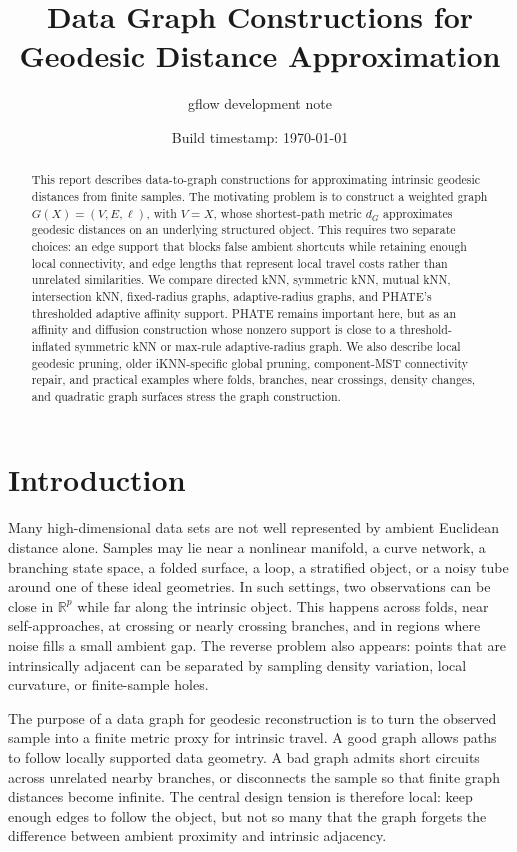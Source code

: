 \documentclass[11pt]{article}
\title{Data Graph Constructions for Geodesic Distance Approximation}
\author{gflow development note}
\date{Build timestamp: \today}
\newcommand{\R}{\mathbb{R}}
\begin{document}
\maketitle

\begin{abstract}
This report describes data-to-graph constructions for approximating intrinsic geodesic
distances from finite samples.  The motivating problem is to construct a weighted graph
\(G(X)=(V,E,\ell)\), with \(V=X\), whose shortest-path metric \(d_G\) approximates
geodesic distances on an underlying structured object.  This requires two separate
choices: an edge support that blocks false ambient shortcuts while retaining enough local
connectivity, and edge lengths that represent local travel costs rather than unrelated
similarities.  We compare directed kNN, symmetric kNN, mutual kNN, intersection kNN,
fixed-radius graphs, adaptive-radius graphs, and PHATE's thresholded adaptive affinity
support.  PHATE remains important here, but as an affinity and diffusion construction
whose nonzero support is close to a threshold-inflated symmetric kNN or max-rule
adaptive-radius graph.  We also describe local geodesic pruning, older iKNN-specific
global pruning, component-MST connectivity repair, and practical examples where folds,
branches, near crossings, density changes, and quadratic graph surfaces stress the graph
construction.
\end{abstract}

\section{Introduction}

Many high-dimensional data sets are not well represented by ambient Euclidean distance
alone.  Samples may lie near a nonlinear manifold, a curve network, a branching state
space, a folded surface, a loop, a stratified object, or a noisy tube around one of these
ideal geometries.  In such settings, two observations can be close in \(\R^p\) while far
along the intrinsic object.  This happens across folds, near self-approaches, at crossing
or nearly crossing branches, and in regions where noise fills a small ambient gap.  The
reverse problem also appears: points that are intrinsically adjacent can be separated by
sampling density variation, local curvature, or finite-sample holes.

The purpose of a data graph for geodesic reconstruction is to turn the observed sample
into a finite metric proxy for intrinsic travel.  A good graph allows paths to follow
locally supported data geometry.  A bad graph admits short circuits across unrelated
nearby branches, or disconnects the sample so that finite graph distances become infinite.
The central design tension is therefore local: keep enough edges to follow the object, but
not so many that the graph forgets the difference between ambient proximity and intrinsic
adjacency.
\end{document}
